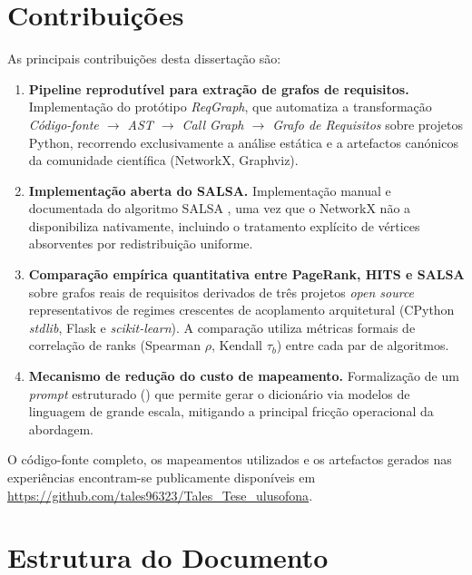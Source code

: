 \section{Contribuições}
\label{sec:contribuicoes}

As principais contribuições desta dissertação são:

\begin{enumerate}
    \item \textbf{Pipeline reprodutível para extração de grafos de
        requisitos.} Implementação do protótipo \emph{ReqGraph}, que
        automatiza a transformação \emph{Código-fonte
        \(\rightarrow\) AST \(\rightarrow\) Call Graph
        \(\rightarrow\) Grafo de Requisitos} sobre projetos Python,
        recorrendo exclusivamente a análise estática e a artefactos
        canónicos da comunidade científica (NetworkX, Graphviz).
    \item \textbf{Implementação aberta do SALSA.} Implementação manual
        e documentada do algoritmo SALSA \parencite{lempel2001}, uma
        vez que o NetworkX não a disponibiliza nativamente, incluindo
        o tratamento explícito de vértices absorventes por
        redistribuição uniforme.
    \item \textbf{Comparação empírica quantitativa entre PageRank,
        HITS e SALSA} sobre grafos reais de requisitos derivados de
        três projetos \emph{open source} representativos de regimes
        crescentes de acoplamento arquitetural (CPython \emph{stdlib},
        Flask e \emph{scikit-learn}). A comparação utiliza métricas
        formais de correlação de ranks (Spearman $\rho$, Kendall
        $\tau_b$) entre cada par de algoritmos.
    \item \textbf{Mecanismo de redução do custo de mapeamento.}
        Formalização de um \emph{prompt} estruturado
        () que permite gerar o
        dicionário  via modelos de linguagem de
        grande escala, mitigando a principal fricção operacional da
        abordagem.
\end{enumerate}

O código-fonte completo, os mapeamentos 
utilizados e os artefactos gerados nas experiências encontram-se
publicamente disponíveis em
\url{https://github.com/tales96323/Tales_Tese_ulusofona}.

\section{Estrutura do Documento}
\label{sec:estrutura}

